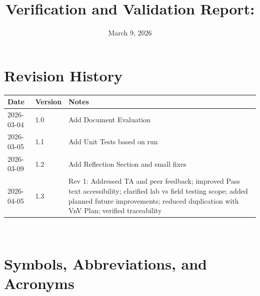 \documentclass[12pt, titlepage]{article}
\begin{document}
\title{Verification and Validation Report: \progname}
\author{\authname}
\date{March 9, 2026}

\maketitle


\section{Revision History}

\begin{tabularx}{\textwidth}{p{3cm}p{2cm}X}
  \toprule {\bf Date} & {\bf Version} & {\bf Notes}                                                                                                                                                                                                \\
  \midrule
  2026-03-04          & 1.0           & Add Document Evaluation                                                                                                                                                                                    \\
  2026-03-05          & 1.1           & Add Unit Tests based on run                                                                                                                                                                                \\
  2026-03-09          & 1.2           & Add Reflection Section and small fixes                                                                                                                                                                     \\
  2026-04-05          & 1.3           & Rev 1: Addressed TA and peer feedback; improved Pass text accessibility; clarified lab vs field testing scope; added planned future improvements; reduced duplication with VnV Plan; verified traceability \\
  \bottomrule
\end{tabularx}

~\newpage

\section{Symbols, Abbreviations, and Acronyms}
\end{document}
